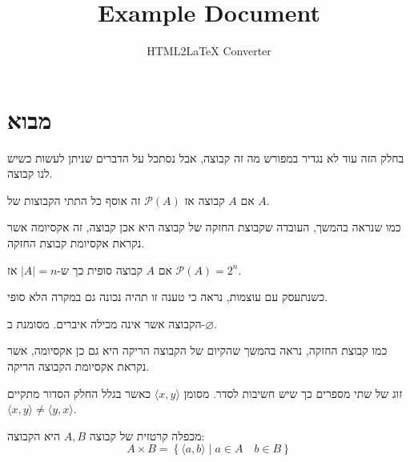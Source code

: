 \documentclass{tstextbook}
\begin{document}
\title{Example Document}
\author{HTML2LaTeX Converter}
\maketitle


\section{מבוא}

בחלק הזה עוד לא נגדיר במפורש מה זה קבוצה, אבל נסתכל על הדברים שניתן לעשות כשיש לנו קבוצה. 

\begin{definition}
אם \(A\) קבוצה אז \(\mathcal{P}(A)\) זה אוסף כל התתי הקבוצות של \(A\).

\end{definition}
\begin{remark}
כמו שנראה בהמשך, העובדה שקבוצת החזקה של קבוצה היא אכן קבוצה, זה אקסיומה אשר נקראת אקסיומת קבוצת החזקה.

\end{remark}
\begin{proposition}
אם \(A\) קבוצה סופית כך ש-\(|A|=n\) אז \(\mathcal{P}(A)=2^{n}\).

\end{proposition}
\begin{remark}
כשנתעסק עם עוצמות, נראה כי טענה זו תהיה נכונה גם במקרה הלא סופי.

\end{remark}
\begin{definition}
הקבוצה אשר אינה מכילה איברים. מסומנת ב-\(\varnothing\).

\end{definition}
\begin{remark}
כמו קבוצת החזקה, נראה בהמשך שהקיום של הקבוצה הריקה היא גם כן אקסיומה, אשר נקראת אקסיומת הקבוצה הריקה.

\end{remark}
\begin{definition}
זוג של שתי מספרים כך שיש חשיבות לסדר. מסומן \(\langle x,y \rangle\) כאשר בגלל החלק הסדור מתקיים \(\langle x, y \rangle\neq \langle y, x \rangle\).

\end{definition}
\begin{definition}
מכפלה קרטזית של קבוצה \(A,B\) היא הקבוצה:
$$A\times B = \left\{  \langle a, b \rangle \mid a\in A\quad b \in B  \right\}$$

\end{definition}
\end{document}

